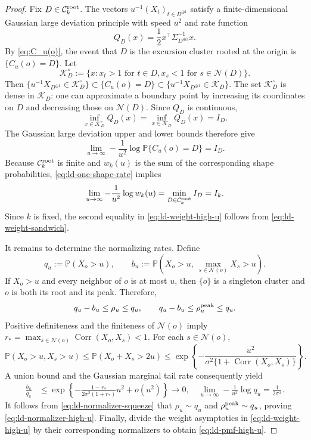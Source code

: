 \documentclass[aap,preprint]{imsart}
\theoremstyle{plain}
\theoremstyle{definition}
\def\P{{\mathbb P}}
\begin{document}
\begin{proof}
	Fix $D\in\mathcal C_k^{\rm root}$.  The vectors
	$u^{-1}(X_t)_{t\in D^{\oplus 1}}$ satisfy a finite-dimensional Gaussian
	large deviation principle with speed $u^2$ and rate function
	\[
	Q_D(x)=\frac12x^\top\Sigma_{D^{\oplus 1}}^{-1}x.
	\]
	By \eqref{eq:C_u(o)}, the event that $D$ is the excursion cluster rooted at the origin is $\{C_u(o)=D\}$. Let
	\[
	\mathcal K_D^\circ
	:=
	\{x:x_t>1\text{ for }t\in D,
	x_s<1\text{ for }s\in\mathcal N(D)\}.
	\]
	Then
	$\{u^{-1}X_{D^{\oplus 1}}\in\mathcal K_D^\circ\}
	\subset \{C_u(o)=D\}\subset
	\{u^{-1}X_{D^{\oplus 1}}\in\mathcal K_D\}$.
	The set $\mathcal K_D^\circ$ is dense in $\mathcal K_D$: one can
	approximate a boundary point by increasing its coordinates on $D$ and
	decreasing those on $\mathcal N(D)$.  Since $Q_D$ is continuous,
	\[
	\inf_{x\in\mathcal K_D^\circ}Q_D(x)
	=
	\inf_{x\in\mathcal K_D}Q_D(x)=I_D.
	\]
	The Gaussian large deviation upper and lower bounds therefore give
	\begin{equation}\label{eq:ld-one-shape-rate}
		\lim_{u\to\infty}
		-\frac1{u^2}\log\P\{C_u(o)=D\}=I_D.
	\end{equation}
	Because $\mathcal C_k^{\rm root}$ is finite and $w_k(u)$ is the sum of
	the corresponding shape probabilities, \eqref{eq:ld-one-shape-rate}
	implies
	\[
	\lim_{u\to\infty}
	-\frac1{u^2}\log w_k(u)
	=\min_{D\in\mathcal C_k^{\rm root}}I_D=I_k.
	\]
	Since $k$ is fixed, the
	second equality in \eqref{eq:ld-weight-high-u} follows from \eqref{eq:ld-weight-sandwich}.
	
	It remains to determine the normalizing rates.  Define
	\begin{equation*}
		q_u:=\P(X_o>u),
		\qquad
		b_u:=\P\!\left(
		X_o>u,\ \max_{s\in\mathcal N(o)}X_s>u
		\right).
	\end{equation*}
	If $X_o>u$ and every neighbor of $o$ is at most $u$, then $\{o\}$ is a
	singleton cluster and $o$ is both its root and its peak.  Therefore,
	\begin{equation}\label{eq:ld-normalizer-squeeze}
		q_u-b_u\leq\rho_u\leq q_u,
		\qquad
		q_u-b_u\leq\rho_u^{\rm peak}\leq q_u.
	\end{equation}
	Positive definiteness and the finiteness of $\mathcal N(o)$ imply $r_*=\max_{s\in\mathcal N(o)}
	\operatorname{Corr}(X_o,X_s)<1$.
	For each $s\in\mathcal N(o)$,
	\[
	\P(X_o>u,X_s>u)
	\leq\P(X_o+X_s>2u)
	\leq
	\exp\!\left\{-\frac{u^2}
	{\sigma^2\{1+\operatorname{Corr}(X_o,X_s)\}}\right\}.
	\]
	A union bound and the Gaussian marginal tail rate consequently yield
	\begin{equation*}
		\begin{aligned}
			\frac{b_u}{q_u}
			&\leq
			\exp\left\{
			-\frac{1-r_*}{2\sigma^2(1+r_*)}u^2+o(u^2)
			\right\}
			\to 0,\quad 
			\lim_{u\to\infty}-\frac1{u^2}\log q_u
			=\frac1{2\sigma^2}.
		\end{aligned}
	\end{equation*}
	It follows from \eqref{eq:ld-normalizer-squeeze} that
	$\rho_u\sim q_u$ and $\rho_u^{\rm peak}\sim q_u$, proving
	\eqref{eq:ld-normalizer-high-u}.  Finally, divide the weight asymptotics
	in \eqref{eq:ld-weight-high-u} by their corresponding normalizers to obtain
	\eqref{eq:ld-pmf-high-u}.
\end{proof}
\end{document}
